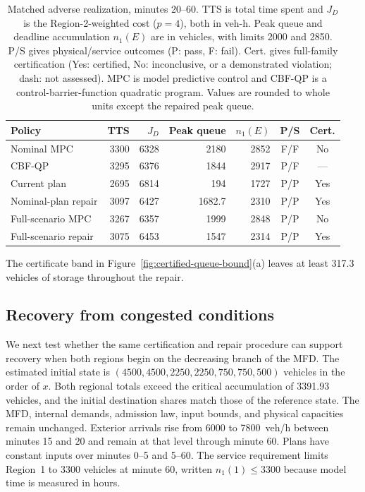 \begin{table}[!htbp]
\centering\footnotesize
\setlength{\belowcaptionskip}{6pt}
\caption{Matched adverse realization, minutes 20--60. TTS is total time
spent and $J_D$ is the Region-2-weighted cost ($p=4$), both in veh-h.
Peak queue and deadline accumulation $n_1(E)$ are in vehicles, with limits
2000 and 2850. P/S gives physical/service outcomes (P: pass, F: fail).
Cert. gives full-family certification (Yes: certified, No: inconclusive,
or a demonstrated violation; dash: not assessed). MPC is model predictive
control and CBF-QP is a control-barrier-function quadratic program.
Values are rounded to whole units except the repaired peak queue.}
\label{tab:benchmark-conflict}
\setlength{\tabcolsep}{3pt}
\begin{tabular}{@{}lrrrrcc@{}}
\toprule
Policy & TTS & $J_D$ & Peak queue & $n_1(E)$ & P/S & Cert.\\
\midrule
Nominal MPC & 3300 & 6328 & 2180 & 2852 & F/F & No\\
CBF-QP & 3295 & 6376 & 1844 & 2917 & P/F & ---\\
Current plan & 2695 & 6814 & 194 & 1727 & P/P & Yes\\
Nominal-plan repair & 3097 & 6427 & 1682.7 & 2310 & P/P & Yes\\
Full-scenario MPC & 3267 & 6357 & 1999 & 2848 & P/P & No\\
Full-scenario repair & 3075 & 6453 & 1547 & 2314 & P/P & Yes\\
\bottomrule
\end{tabular}
\end{table}

The certificate band in Figure~\ref{fig:certified-queue-bound}(a)
leaves at least 317.3 vehicles of storage throughout the repair.



\subsection{Recovery from congested conditions}
\label{sec:congested-results}

We next test whether the same certification and repair procedure can
support recovery when both regions begin on the decreasing branch of
the MFD. The estimated initial state is
$(4500,4500,2250,2250,750,750,500)$ vehicles in the order of $x$.
Both regional totals exceed the critical accumulation of 3391.93 vehicles,
and the initial destination shares match those of the reference state.
The MFD, internal demands, admission law, input bounds, and physical
capacities remain unchanged. Exterior arrivals rise from 6000 to
7800~veh/h between minutes 15 and 20 and remain at that level through
minute 60. Plans have constant inputs over minutes 0--5 and 5--60.
The service requirement limits Region~1 to 3300 vehicles at minute 60,
written $n_1(1)\le3300$ because model time is measured in hours.

